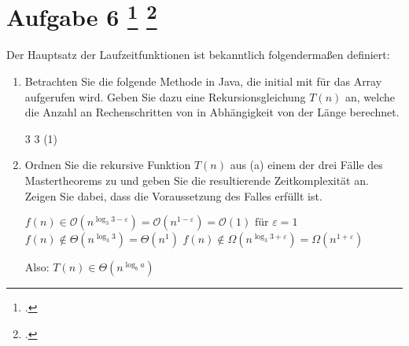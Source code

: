 \documentclass{lehramt-informatik-aufgabe}
\begin{document}

\section{Aufgabe 6 
\footcite[Seite 39 (PDF 26)]{aud:fs:2}
\footcite[Thema 2 Aufgabe 6]{examen:66115:2018:03}
}

Der Hauptsatz der Laufzeitfunktionen ist bekanntlich folgendermaßen
definiert:

\liMasterExkurs

\begin{enumerate}

\item Betrachten Sie die folgende Methode  in Java, die
initial mit  für das Array 
aufgerufen wird. Geben Sie dazu eine Rekursionsgleichung $T(n)$ an,
welche die Anzahl an Rechenschritten von  in Abhängigkeit
von der Länge  berechnet.


\begin{liAntwort}
\liMasterVariablenDeklaration
{3} %
{3} %
{(1)} %
\end{liAntwort}


\item Ordnen Sie die rekursive Funktion $T(n)$ aus (a) einem der drei
Fälle des Mastertheorems zu und geben Sie die resultierende
Zeitkomplexität an. Zeigen Sie dabei, dass die Voraussetzung des Falles
erfüllt ist.

\begin{liAntwort}

\liMasterFallRechnung
{$f(n) \in \mathcal{O}\left(n^{\log_{3}3-\varepsilon}\right) =
\mathcal{O}\left(n^{1-\varepsilon}\right) =
\mathcal{O}\left(1\right) \text{ für } \varepsilon = 1
$}
{$f(n) \notin \Theta \left(n^{{\log_{3}3}}\right) =
\Theta \left(n^1\right)
$}
{$f(n) \notin \Omega \left(n^{\log_{3}3 + \varepsilon}\right) =
\Omega \left(n^{1 + \varepsilon}\right)$}

Also: $T(n)\in \Theta \left(n^{\log_{b}a}\right)$

\end{liAntwort}
\end{enumerate}
\end{document}
